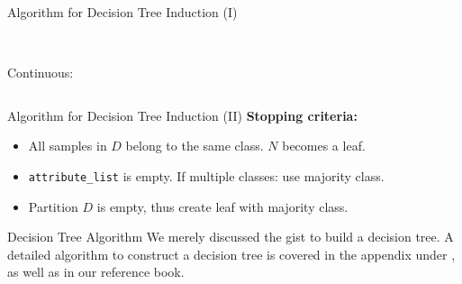 \begin{frame}{Algorithm for Decision Tree Induction (I)}
\begin{columns}
\begin{column}{0.25\textwidth}
			~ \\\bigskip
			Continuous:
			\begin{figure}[t]
				\centering
				
			\end{figure}

		\end{column}
	\end{columns}


\end{frame}

\begin{frame}{Algorithm for Decision Tree Induction (II)}
	\textbf{Stopping criteria:}
	\begin{itemize}
		\item All samples in $D$ belong to the same class. $N$ becomes a leaf.
		\item \texttt{attribute\_list} is empty. If multiple classes: use majority class.
		\item Partition $D$ is empty, thus create leaf with majority class.
	\end{itemize}
	\vfill
	\begin{alertblock}{Decision Tree Algorithm}
		We merely discussed the gist to build a decision tree. A detailed algorithm to construct a decision tree is covered in the appendix under \hyperlink{algo:decision-tree}{}, as well as in our reference book.
	\end{alertblock}
\end{frame}


